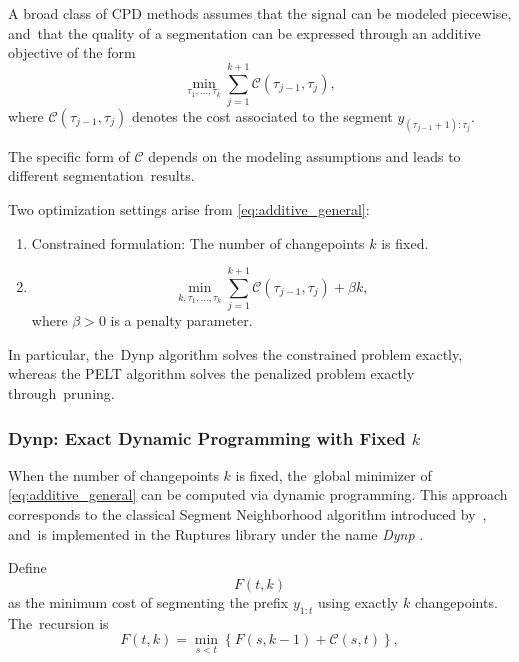 \documentclass[mathematics,article,accept,pdftex,moreauthors]{Definitions/mdpi}
\begin{document}
A broad class of CPD methods assumes that the signal can be modeled piecewise, and~that the quality of a segmentation can be expressed through an additive objective of the form
\begin{equation}
	\label{eq:additive_general}
	\min_{\tau_1,\dots,\tau_k}
	\sum_{j=1}^{k+1} \mathcal{C}(\tau_{j-1},\tau_j),
\end{equation}
where $\mathcal{C}(\tau_{j-1},\tau_j)$ denotes the cost associated to the segment $y_{(\tau_{j-1}+1):\tau_j}$.

The specific form of $\mathcal{C}$ depends on the modeling assumptions and leads to different segmentation~results.

Two optimization settings arise from \eqref{eq:additive_general}:
\begin{enumerate}
	\item Constrained formulation: The number of changepoints $k$ is fixed.
	\item {}
\begin{equation}
		\label{eq:penalized_general}
		\min_{k,\tau_1,\dots,\tau_k}
		\sum_{j=1}^{k+1} \mathcal{C}(\tau_{j-1},\tau_j)
		+ \beta k,
	\end{equation}
	where $\beta>0$ is a penalty parameter. 
\end{enumerate}

In particular, the~Dynp algorithm solves the constrained problem exactly, whereas the PELT algorithm solves the penalized problem exactly through~pruning.

\subsubsection{Dynp: Exact Dynamic Programming with Fixed $k$}

When the number of changepoints $k$ is fixed, the~global minimizer of \eqref{eq:additive_general} can be computed via dynamic programming. 
This approach corresponds to the classical Segment Neighborhood algorithm introduced by~\cite{AL89}, and~is implemented in the Ruptures library under the name {\it Dynp} \cite{rupweb}.

Define
\[
F(t,k)
\]
as the minimum cost of segmenting the prefix $y_{1:t}$ using exactly $k$ changepoints. The~recursion is
\begin{equation}
	\label{eq:dynp_recursion_consistent}
	F(t,k)
	=
	\min_{s < t}
	\left\{
	F(s,k-1)
	+
	\mathcal{C}(s,t)
	\right\},
\end{equation}
\end{document}
